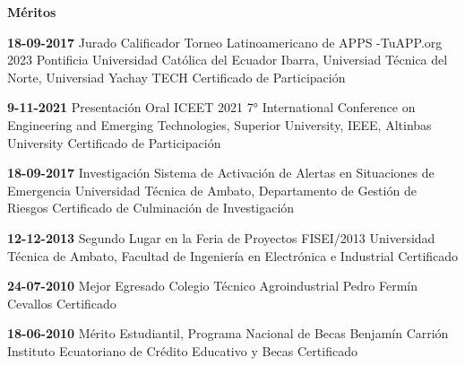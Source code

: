 \pagestyle{empty}
\begin{mainbar}
    \textbf{Méritos}
\end{mainbar}

\begin{levent}
    \cvevent
	{\textbf{18-09-2017}}
	{Jurado Calificador}
	{Torneo Latinoamericano de APPS -TuAPP.org 2023}
	{Pontificia Universidad Católica del Ecuador Ibarra, Universiad Técnica del Norte, Universiad Yachay TECH}
	{Certificado de Participación}
\end{levent}


\begin{devent}
    \cvevent
	{\textbf{9-11-2021}}
	{Presentación Oral ICEET 2021}
	{7° International Conference on Engineering and Emerging Technologies, Superior University, IEEE, Altinbas University}
	{Certificado de Participación}
	{}
\end{devent}
\begin{levent}
    \cvevent
	{\textbf{18-09-2017}}
	{Investigación}
	{Sistema de Activación de Alertas en Situaciones de Emergencia}
	{Universidad Técnica de Ambato, Departamento de Gestión de Riesgos}
	{Certificado de Culminación de Investigación}
\end{levent}
\begin{devent}
    \cvevent
	{\textbf{12-12-2013}}
	{Segundo Lugar en la Feria de Proyectos FISEI/2013}
	{Universidad Técnica de Ambato, Facultad de Ingeniería en Electrónica e Industrial}
	{Certificado}
	{}
\end{devent}

\begin{levent}
    \cvevent
	{\textbf{24-07-2010}}
	{Mejor Egresado}
	{Colegio Técnico Agroindustrial Pedro Fermín Cevallos}
	{Certificado}
	{}
\end{levent}

\begin{devent}
    \cvevent
	{\textbf{18-06-2010}}
	{Mérito Estudiantil, Programa Nacional de Becas Benjamín Carrión}
	{Instituto Ecuatoriano de Crédito Educativo y Becas}
	{Certificado}
	{}
\end{devent}



\newpage
\setlength{\headheight}{15pt}
\pagestyle{fancy}
\fancyhf{}
\rhead[Ponencias]{\rightmark}
\lfoot[\thepage]{}
\rfoot[]{\thepage}

